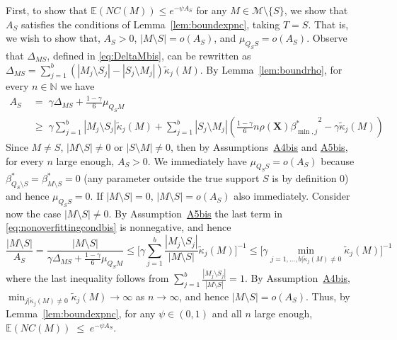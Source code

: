 \documentclass[
  12pt]{article}
\newcommand{\E}{\mathbb{E}}
\newcommand{\N}{\mathbb{N}}
\newcommand{\bX}{\mathbf{X}}
\begin{document}
First, to show that $\E(NC(M)) \leq e^{-\psi A_S}$
for any $M\in\mathcal{M}\setminus \{S\}$, we show that $A_S$ satisfies the conditions of Lemma~\ref{lem:boundexpnc}, taking $T=S$. 
That is, we wish to show that, $A_S>0$, $|M\setminus S|=o(A_S)$, and $\mu_{Q_S S}=o(A_S)$. 
Observe that $\Delta_{MS}$, defined in \eqref{eq:DeltaMbis}, can be rewritten as $\Delta_{MS}=\sum_{j=1}^b(|M_j\setminus S_j|-|S_j\setminus M_j|)\tilde{\kappa}_j(M)$. By  Lemma~\ref{lem:boundrho}, for every $n\in \N$ we have 
\begin{equation}\label{eq:nonoverfittingcondbis}
\begin{aligned}
   A_S\;&=\; \gamma \Delta_{MS}+\frac{1-\gamma}{6}\mu_{Q_SM}\\
   &\geq\; \gamma\sum_{j=1}^b|M_j \setminus S_j|\tilde{\kappa}_j(M) + \sum_{j=1}^b |S_j\setminus M_j |\left(\tfrac{1-\gamma}{6} n \rho(\bX) {\beta^*_{\min,j}}^{2} - \gamma\tilde{\kappa}_j(M)\right) 
\end{aligned}
\end{equation} 
Since $M\neq S$, $|M\setminus S|\neq0$ or $|S\setminus M|\neq0$, then by Assumptions~\hyperlink{lab:A4bis}{A4bis} and \hyperlink{lab:A4}{A5bis}, for every $n$ large enough, $A_S>0$. We immediately have $\mu_{Q_S S}=o(A_S)$ because $\beta^*_{Q_S\setminus S}=\beta^*_{M\setminus S}=0$ (any parameter outside the true support $S$ is by definition 0) and hence $\mu_{Q_S S}=0$.
If $|M\setminus S|=0$, $|M\setminus S|=o(A_S)$ also immediately. Consider now the case $|M\setminus S|\neq 0$. By Assumption~\hyperlink{lab:A4}{A5bis} the last term in \eqref{eq:nonoverfittingcondbis} is nonnegative, and hence
$$\frac{|M\setminus S|}{A_S}
= \frac{|M\setminus S|}{\gamma \Delta_{MS}+\frac{1-\gamma}{6}\mu_{Q_SM}}
\leq \bigg[ \gamma\sum_{j=1}^b\frac{|M_j \setminus S_j|}{|M\setminus S|}\tilde{\kappa}_j(M) \bigg]^{-1} \leq \Big[ \gamma\min_{j=1,\ldots,b|\tilde{\kappa}_j(M) \neq0}\tilde{\kappa}_j(M) \Big]^{-1} $$
where the last inequality follows from $\sum_{j=1}^b\frac{|M_j \setminus S_j|}{|M\setminus S|}=1$. By Assumption~\hyperlink{lab:A4bis}{A4bis}, $\min_{j|\tilde{\kappa}_j(M) \neq0} \tilde{\kappa}_j(M) \to \infty$ as $n \rightarrow \infty$, and hence $|M\setminus S|=o(A_S)$. Thus, %
by Lemma~\ref{lem:boundexpnc}, for any $\psi\in(0,1)$ and all $n$ large enough,
$
\E(NC(M))\;\leq\;e^{-\psi A_S}.
$
\end{document}
